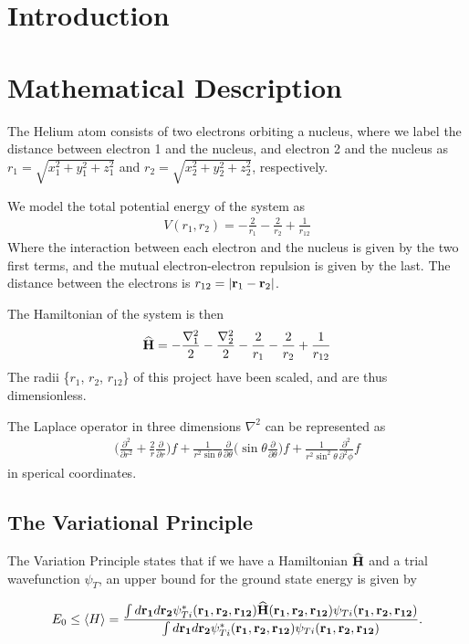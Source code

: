 \documentclass[twocolumn]{article}[12pt]
\newcommand{\eq}[1]{\begin{align*}#1\end{align*}}
\renewcommand\vec[1]{{\bf #1}}
\newcommand{\OP}[1]{{\bf\widehat{#1}}}
\begin{document}
\section{Introduction}

\section{Mathematical Description}

The Helium atom consists of two electrons orbiting a nucleus,
where we label the distance between electron 1 and the nucleus,
and electron 2 and the nucleus as
$r_1 = \sqrt{x_1^2 + y_1^2 + z_1^2}$ 
and $r_2 = \sqrt{x_2^2 + y_2^2 + z_2^2}$, respectively.

We model the total potential energy of the system as
\eq{
    V(r_1,r_2)=-\frac{2}{r_1}-\frac{2}{r_2}+\frac{1}{r_{12}}
}
Where the interaction between each electron and the nucleus
is given by the two first terms,
and the mutual electron-electron repulsion is given by the last.
The distance between the electrons is $r_{12}=|\vec r_1-\vec r_2|$.

The Hamiltonian of the system is then
\eq{
    \OP H = -\frac{\nabla_1 ^2}{2} -\frac{\nabla_2 ^2}{2}
    -\frac{2}{r_1}-\frac{2}{r_2}+\frac{1}{r_{12}}
}
The radii \{$r_1$, $r_2$, $r_{12}$\} 
of this project have been scaled, and are thus dimensionless.

The Laplace operator in three dimensions $\nabla^2$ can be represented as
\eq{
  \bigg( \frac{\partial^2}{\partial r^2} 
    + \frac{2}{r} \frac{\partial}{\partial r} \bigg) f
    +\frac{1}{r^2 \sin\theta}\frac{\partial}{\partial \theta}
    \bigg( \sin\theta \frac{\partial}{\partial \theta}  \bigg) f
    +\frac{1}{r^2 \sin^2\theta}\frac{\partial^2}{\partial^2 \phi} f
}
in sperical coordinates.

\subsection{The Variational Principle}
The Variation Principle states that if we have a Hamiltonian
$\OP H$ and a trial wavefunction $\psi_{T}$,
an upper bound for the ground state energy is given by

\eq{E_0 \leq
   \langle H \rangle =
   \frac{\int d{\bf r_1}d{\bf r_2}\psi^{\ast}_{Ti}({\bf r_1},{\bf r_2}, 
       {\bf r_{12}})
   \OP{H}({\bf r_1},{\bf r_2}, {\bf r_{12}})
   \psi_{Ti}({\bf r_1},{\bf r_2}, {\bf r_{12}})}
   {\int d{\bf r_1}d{\bf r_2}\psi^{\ast}_{Ti}({\bf r_1},{\bf r_2}, {\bf r_{12}})
   \psi_{Ti}({\bf r_1},{\bf r_2}, {\bf r_{12}})}.
}
\end{document}
